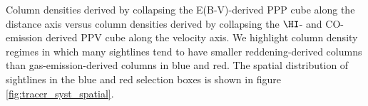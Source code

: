 \label{fig:tracer_syst_values}

Column densities derived by collapsing the E(B-V)-derived PPP cube along the distance axis versus column densities derived by collapsing the $\HI$- and CO-emission derived PPV cube along the velocity axis. We highlight column density regimes in which many sightlines tend to have smaller reddening-derived columns than gas-emission-derived columns in blue and red. The spatial distribution of sightlines in the blue and red selection boxes is shown in figure \ref{fig:tracer_syst_spatial}.